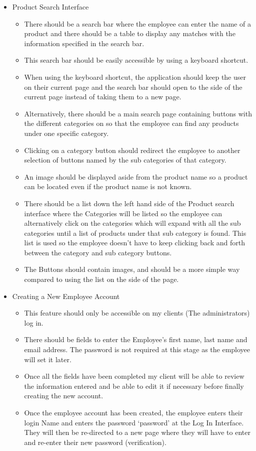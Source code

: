 \begin{itemize}
\begin{itemize}
	\item Product Search Interface
	\begin{itemize}
		\item There should be a search bar where the employee can enter the name of a product and there should be a table to display any matches with the information specified in the search bar.
		\item This search bar should be easily accessible by using a keyboard shortcut.
		\item When using the keyboard shortcut, the application should keep the user on their current page and the search bar should open to the side of the current page instead of taking them to a new page.
		\item Alternatively, there should be a main search page containing buttons with the different categories on so that the employee can find any products under one specific category.
		\item Clicking on a category button should redirect the employee to another selection of buttons named by the sub categories of that category.
		\item An image should be displayed aside from the product name so a product can be located even if the product name is not known.
		\item There should be a list down the left hand side of the Product search interface where the Categories will be listed so the employee can alternatively click on the categories which will expand with all the sub categories until a list of products under that sub category is found. This list is used so the employee doesn’t have to keep clicking back and forth between the category and sub category buttons.
		\item The Buttons should contain images, and should be a more simple way compared to using the list on the side of the page.
	\end{itemize}

	\item Creating a New Employee Account
	\begin{itemize}
		\item This feature should only be accessible on my clients (The administrators) log in.
		\item There should be fields to enter the Employee's first name, last name and email address. The password is not required at this stage as the employee will set it later.
		\item Once all the fields have been completed my client will be able to review the information entered and be able to edit it if necessary before finally creating the new account.
		\item Once the employee account has been created, the employee enters their login Name and enters the password ‘password’ at the Log In Interface. They will then be re-directed to a new page where they will have to enter and re-enter their new password (verification). 
	\end{itemize}


\end{itemize}
\end{itemize}
